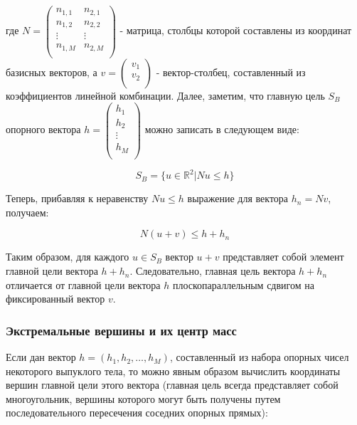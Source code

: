 \documentclass[a4paper, 12pt, titlepage]{article}
\theoremstyle{definition}
\theoremstyle{plain}
\theoremstyle{plain}
\begin{document}
где $N = \left(
     \begin{array}{cc}
      n_{1, 1} & n_{2, 1} \\
      n_{1, 2} & n_{2, 2} \\
      \vdots & \vdots \\
      n_{1, M} & n_{2, M} \\
     \end{array}
     \right)$ - матрица, столбцы которой составлены из координат базисных
векторов, а
$v = \left(
     \begin{array}{c}
      v_{1} \\
      v_{2} \\
     \end{array}
     \right)$ - вектор-столбец, составленный из коэффициентов линейной
комбинации. Далее, заметим, что главную цель $S_{B}$ опорного вектора
$h = \left(
  \begin{array}{c}
   h_{1} \\
   h_{2} \\
   \vdots \\
   h_{M} \\
  \end{array}
  \right)$ можно записать в следующем виде:

\begin{equation}
S_{B} = \{u \in \mathbb{R}^{2} | N u \leq h\}
\end{equation}

Теперь, прибавляя к неравенству $N u \leq h$ выражение для вектора
$h_{n} = N v$, получаем:

\begin{equation}
N (u + v) \leq h + h_{n}
\end{equation}

Таким образом, для каждого $u \in S_{B}$ вектор $u + v$ представляет собой
элемент главной цели вектора $h + h_{n}$. Следовательно, главная цель вектора
$h + h_{n}$ отличается от главной цели вектора $h$ плоскопараллельным сдвигом на
фиксированный вектор $v$.

\subsubsection{Экстремальные вершины и их центр масс}
\label{sec:support-methods:2d-uniform:extreme-vertices}

Если дан вектор $h = (h_{1}, h_{2}, \ldots, h_{M})$, составленный из набора
опорных чисел некоторого выпуклого тела, то можно явным образом вычислить
координаты вершин главной цели этого вектора (главная цель всегда представляет
собой многоугольник, вершины которого могут быть получены путем
последовательного пересечения соседних опорных прямых):
\end{document}
